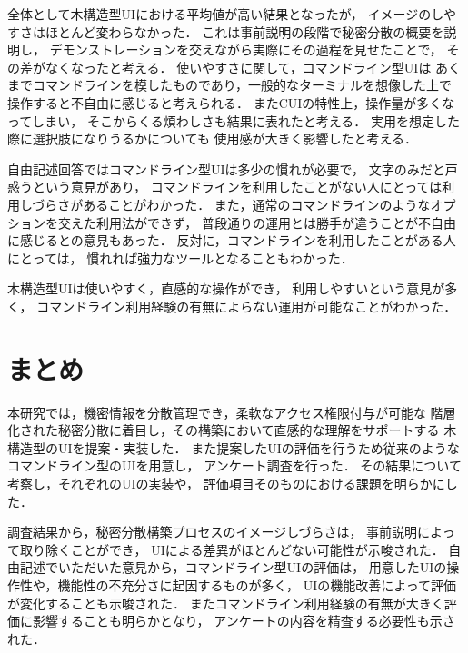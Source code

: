 \documentclass[fleqn, uplatex]{jsarticle}
\begin{document}
全体として木構造型UIにおける平均値が高い結果となったが，%
イメージのしやすさはほとんど変わらなかった．%
これは事前説明の段階で秘密分散の概要を説明し，%
デモンストレーションを交えながら実際にその過程を見せたことで，%
その差がなくなったと考える．
使いやすさに関して，コマンドライン型UIは%
あくまでコマンドラインを模したものであり，一般的なターミナルを想像した上で%
操作すると不自由に感じると考えられる．%
またCUIの特性上，操作量が多くなってしまい，%
そこからくる煩わしさも結果に表れたと考える．
実用を想定した際に選択肢になりうるかについても%
使用感が大きく影響したと考える．

自由記述回答ではコマンドライン型UIは多少の慣れが必要で，%
文字のみだと戸惑うという意見があり，%
コマンドラインを利用したことがない人にとっては利用しづらさがあることがわかった．%
また，通常のコマンドラインのようなオプションを交えた利用法ができず，%
普段通りの運用とは勝手が違うことが不自由に感じるとの意見もあった．
反対に，コマンドラインを利用したことがある人にとっては，%
慣れれば強力なツールとなることもわかった．

木構造型UIは使いやすく，直感的な操作ができ，%
利用しやすいという意見が多く，%
コマンドライン利用経験の有無によらない運用が可能なことがわかった．

\section{まとめ}
本研究では，機密情報を分散管理でき，柔軟なアクセス権限付与が可能な%
階層化された秘密分散に着目し，その構築において直感的な理解をサポートする%
木構造型のUIを提案・実装した．
また提案したUIの評価を行うため従来のようなコマンドライン型のUIを用意し，%
アンケート調査を行った．%
その結果について考察し，それぞれのUIの実装や，%
評価項目そのものにおける課題を明らかにした．

調査結果から，秘密分散構築プロセスのイメージしづらさは，%
事前説明によって取り除くことができ，%
UIによる差異がほとんどない可能性が示唆された．%
自由記述でいただいた意見から，コマンドライン型UIの評価は，%
用意したUIの操作性や，機能性の不充分さに起因するものが多く，%
UIの機能改善によって評価が変化することも示唆された．%
またコマンドライン利用経験の有無が大きく評価に影響することも明らかとなり，%
アンケートの内容を精査する必要性も示された．
\end{document}
